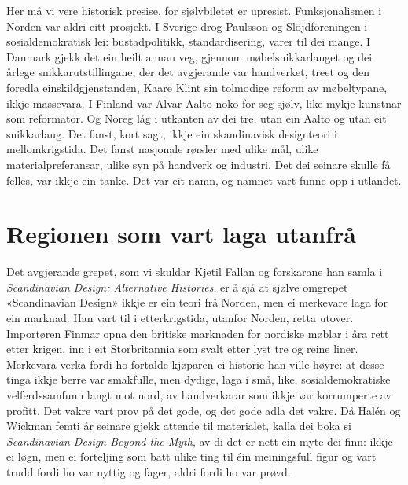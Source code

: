 Her må vi vere historisk presise, for sjølvbiletet er upresist. Funksjonalismen i Norden var aldri eitt prosjekt. I Sverige drog Paulsson og Slöjdföreningen i sosialdemokratisk lei: bustadpolitikk, standardisering, varer til dei mange. I Danmark gjekk det ein heilt annan veg, gjennom møbelsnikkarlauget og dei årlege snikkarutstillingane, der det avgjerande var handverket, treet og den foredla einskildgjenstanden, Kaare Klint sin tolmodige reform av møbeltypane, ikkje massevara. I Finland var Alvar Aalto noko for seg sjølv, like mykje kunstnar som reformator. Og Noreg låg i utkanten av dei tre, utan ein Aalto og utan eit snikkarlaug. Det fanst, kort sagt, ikkje ein skandinavisk designteori i mellomkrigstida. Det fanst nasjonale rørsler med ulike mål, ulike materialpreferansar, ulike syn på handverk og industri. Det dei seinare skulle få felles, var ikkje ein tanke. Det var eit namn, og namnet vart funne opp i utlandet.


\section{Regionen som vart laga utanfrå}

Det avgjerande grepet, som vi skuldar Kjetil Fallan og forskarane han samla i \textit{Scandinavian Design: Alternative Histories}, er å sjå at sjølve omgrepet «Scandinavian Design» ikkje er ein teori frå Norden, men ei merkevare laga for ein marknad\autocite{fallan2012scandinavian}. Han vart til i etterkrigstida, utanfor Norden, retta utover. Importøren Finmar opna den britiske marknaden for nordiske møblar i åra rett etter krigen, inn i eit Storbritannia som svalt etter lyst tre og reine liner\autocite{davies1998}. Merkevara verka fordi ho fortalde kjøparen ei historie han ville høyre: at desse tinga ikkje berre var smakfulle, men dydige, laga i små, like, sosialdemokratiske velferdssamfunn langt mot nord, av handverkarar som ikkje var korrumperte av profitt. Det vakre vart prov på det gode, og det gode adla det vakre. Då Halén og Wickman femti år seinare gjekk attende til materialet, kalla dei boka si \textit{Scandinavian Design Beyond the Myth}, av di det er nett ein myte dei finn\autocite{halen2003}: ikkje ei løgn, men ei forteljing som batt ulike ting til éin meiningsfull figur og vart trudd fordi ho var nyttig og fager, aldri fordi ho var prøvd.

